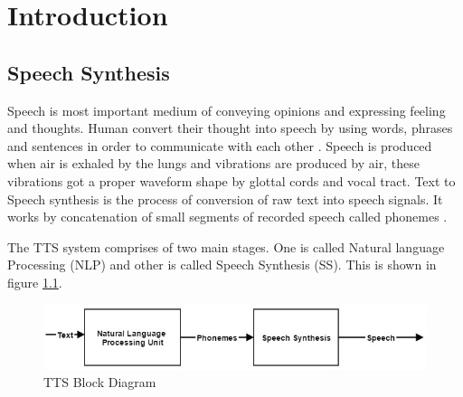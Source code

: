 \chapter{Introduction}

\section{Speech Synthesis}

Speech is most important medium of conveying opinions and expressing feeling and thoughts.
Human convert their thought into speech by using words, phrases and sentences in order to communicate with each other \cite{mumtaz2016break}. Speech is produced when air is exhaled by the lungs and vibrations are produced by air, these vibrations got a proper waveform shape by glottal cords and vocal tract. Text to Speech synthesis is the process of conversion of raw text into speech signals. It works by concatenation of small segments of recorded speech called phonemes \cite{khilari2015review}.

The TTS system comprises of two main stages. One is called Natural language Processing (NLP) and
other is called Speech Synthesis (SS). This is shown in figure \ref{fig:TTS Block Diagram}.

\begin{center}
\begin{figure}[hbtp]
\centering
  \includegraphics[width=\linewidth]{images/tts_bd.jpg}
  \caption{TTS Block Diagram}
  \label{fig:TTS Block Diagram}
\end{figure}

\end{center}

